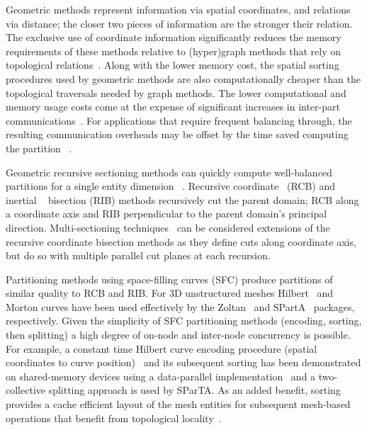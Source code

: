 Geometric methods represent information via spatial coordinates, and
relations via distance; the closer two pieces of information
are the stronger their relation.
The exclusive use of coordinate information significantly reduces the memory
requirements of these methods relative to (hyper)graph methods that rely on
topological relations~\cite{harlacherMortonSFCvsParmetis2012}.
Along with the lower memory cost, the spatial sorting procedures used by
geometric methods are also computationally cheaper than the topological traversals
needed by graph methods.
The lower computational and memory usage costs come at the expense of
significant increases in inter-part
communications~\cite{schambergerSFCpartition2005}.
For applications that require frequent balancing through, the resulting
communication overheads may be offset by the time saved computing the partition
~\cite{harlacherMortonSFCvsParmetis2012}.

Geometric recursive sectioning methods can quickly compute well-balanced
partitions for a single entity dimension
~\cite{zoltan2,devineMultiJagged2015,SauleJagged2012,TaylorRIB,williamsRIB}.
Recursive coordinate~\cite{bergerRib1987} (RCB) and inertial
~\cite{simon1991partitioning,TaylorRIB,williamsRIB}
bisection (RIB) methods
recursively cut the parent domain; RCB along a coordinate axis and RIB
perpendicular to the parent domain's principal direction.
Multi-sectioning techniques~\cite{devineMultiJagged2015,SauleJagged2012} can be
considered extensions of the recursive coordinate bisection methods as they
define cuts along coordinate axis, but do so with multiple parallel cut planes
at each recursion.

Partitioning methods using space-filling curves (SFC) produce partitions
of similar quality to RCB and RIB.
For 3D unstructured meshes Hilbert~\cite{skilling2004programming} and Morton
curves have been used effectively by the Zoltan~\cite{devine2005new}
and SPartA~\cite{harlacherMortonSFCvsParmetis2012} packages,
respectively.
Given the simplicity of SFC partitioning methods (encoding, sorting, then
splitting) a high degree of on-node and inter-node concurrency is possible.
For example, a constant time Hilbert curve encoding procedure (spatial
coordinates to curve position)~\cite{skilling2004programming} and its subsequent
sorting has been demonstrated on shared-memory devices using a data-parallel
implementation~\cite{ibanezthesis} and a two-collective splitting approach is
used by SParTA.
As an added benefit, sorting provides a cache efficient layout
of the mesh entities for subsequent mesh-based operations that benefit from
topological locality~\cite{gpsReordering1976,zhou2010adjacency}.
